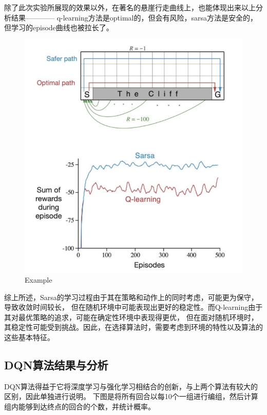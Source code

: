 \documentclass{thuemp}
\begin{document}
除了此次实验所展现的效果以外，在著名的悬崖行走曲线上，也能体现出来以上分析结果\cite{Ruoyu}————
q-learning方法是optimal的，但会有风险，sarsa方法是安全的，但学习的episode曲线也被拉长了。
\begin{figure}[H]
  \centering
  \includegraphics[width=1\linewidth]{./img/example.png}
  \caption{Example}
\end{figure}

综上所述，Sarsa的学习过程由于其在策略和动作上的同时考虑，可能更为保守，导致收敛时间较长，
但在随机环境中可能表现出更好的稳定性。而Q-learning由于其对最优策略的追求，可能在确定性环境中表现得更优，
但在面对随机环境时，其稳定性可能受到挑战。因此，在选择算法时，需要考虑到环境的特性以及算法的这些基本特征。\\
\vbox{}

\subsection{DQN算法结果与分析}
DQN算法得益于它将深度学习与强化学习相结合的创新，与上两个算法有较大的区别，因此单独进行说明。
下图是将所有回合以每10个一组进行编组，然后计算组内能够到达终点的回合的个数，并统计概率。
\end{document}
